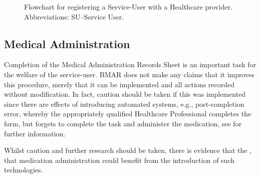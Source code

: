 \documentclass[runningheads]{llncs}
\begin{document}
\begin{figure}
\centering
{}
	\caption{Flowchart for registering a Service-User with a Healthcare provider. Abbreviations: SU\---Service User.}
\label{fig:fc:register}
\end{figure}

\subsection{Medical Administration}
Completion of the Medical Administration Records Sheet is an important task for the welfare of the service-user. BMAR does not make any claims that it improves this procedure, merely that it can be implemented and all actions recorded without modification. In fact, caution should be taken if this was implemented since there are effects of introducing automated systems, e.g., post-completion error, whereby the appropriately qualified Healthcare Professional completes the form, but forgets to complete the task and administer the medication, see \cite{li2005post} for further information.

Whilst caution and further research should be taken, there is evidence that the \cite{bennett2003computerised,bates1998effect}, that medication administration could benefit from the introduction of such technologies. 
\end{document}
